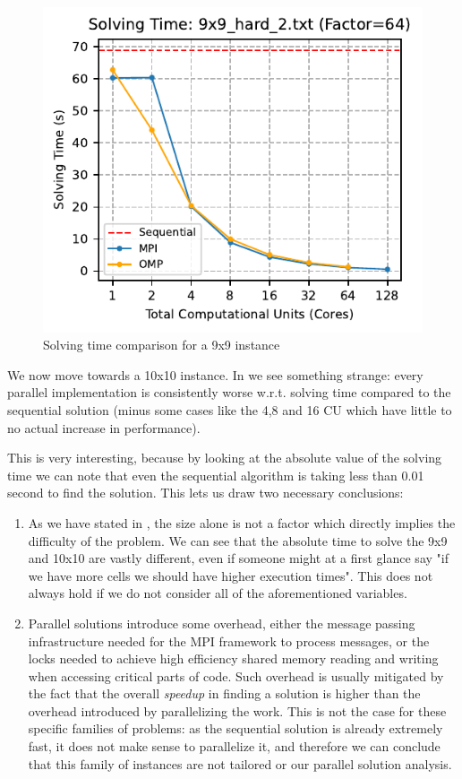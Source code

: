 \begin{figure}[htbp]
\centering
\includegraphics[width=0.9\linewidth]{imgs/solving_time_mpi_omp_9x9_hard_2.pdf}
\caption{Solving time comparison for a 9x9 instance}
\label{fig:comparison_solving_time_9x9}
\end{figure}

We now move towards a 10x10 instance. In  we see something strange: every parallel implementation is consistently worse w.r.t. solving time compared to the sequential solution (minus some cases like the 4,8 and 16 CU which have little to no actual increase in performance). 

This is very interesting, because by looking at the absolute value of the solving time we can note that even the sequential algorithm is taking less than 0.01 second to find the solution. This lets us draw two necessary conclusions:
\begin{enumerate}
    \item As we have stated in , the size alone is not a factor which directly implies the difficulty of the problem. We can see that the absolute time to solve the 9x9 and 10x10 are vastly different, even if someone might at a first glance say "if we have more cells we should have higher execution times". This does not always hold if we do not consider all of the aforementioned variables.
    \item Parallel solutions introduce some overhead, either the message passing infrastructure needed for the MPI framework to process messages, or the locks needed to achieve high efficiency shared memory reading and writing when accessing critical parts of code. Such overhead is usually mitigated by the fact that the overall \textit{speedup} in finding a solution is higher than the overhead introduced by parallelizing the work. This is not the case for these specific families of problems: as the sequential solution is already extremely fast, it does not make sense to parallelize it, and therefore we can conclude that this family of instances are not tailored or our parallel solution analysis.
\end{enumerate}

